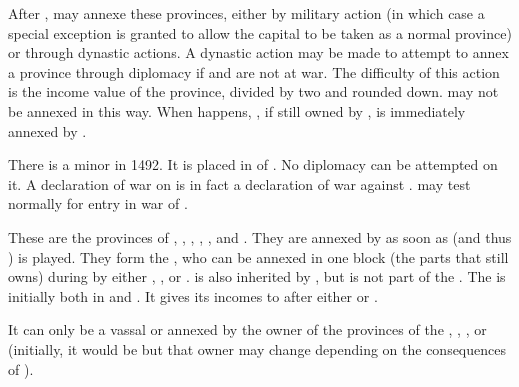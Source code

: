 \aparag[Disappearance] After , \SPA may
annexe these provinces, either by military action (in which case a
special exception is granted to allow the capital to be taken as a
normal province) or through dynastic actions.
\bparag\label{chSpecific:Belgium:Diplomatic Annexation} A dynastic action may
be made to attempt to annex a province through diplomacy if \SPA and
 are not at war. The difficulty of this action is the
income value of the province, divided by two and rounded
down.  may not be annexed in this way.
\bparag When  happens,
\provinceZeeland, if still owned by , is immediately
annexed by \HIS.


\label{chSpecific:Burgundy}
 There is a minor
 in 1492. It is placed in \EW of \HAB. No diplomacy can
be attempted on it.
\bparag A declaration of war on  is in fact a
declaration of war against \HAB.
\bparag \HAB may test normally for entry in war of .

 These are the provinces of
, , ,
, ,  and
. They are annexed by \SPA as soon as
 (and thus ) is
played. They form the , who can be annexed
in one block (the parts that \SPA still owns) during 
by either \AUS, \ENG, \FRA or \SPA.
\bparag {} is also inherited by \SPA, but is not
part of the .
\bparag The  is initially both in  and
. It gives its incomes to \SPA after either
 or .

\label{chSpecific:Liege}
It can only be a vassal or annexed by the owner of the
provinces of the , \SPA, \AUS, \ENG or \FRA
(initially, it would be \SPA but that owner may change depending on the
consequences of ).

